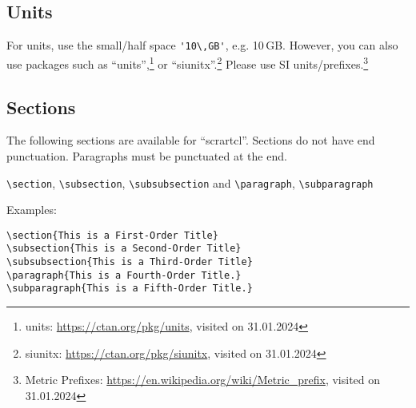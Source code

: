 \documentclass[
  paper       = a4,
  headheight  = 16pt,
  footheight  = 16pt,
  fontsize    = 10pt,
  twoside     = true,
  titlepage   = true,
]{scrartcl}
\begin{document}
\subsection{Units}

For units, use the small/half space \lstinline|'10\,GB'|, e.g. 10\,GB.
However, you can also use packages such as \enquote{units},\footnote{units: \url{https://ctan.org/pkg/units}, visited on 31.01.2024}
or \enquote{siunitx}.\footnote{siunitx: \url{https://ctan.org/pkg/siunitx}, visited on 31.01.2024}
Please use SI units/prefixes.\footnote{Metric Prefixes: \url{https://en.wikipedia.org/wiki/Metric_prefix}, visited on 31.01.2024}


\subsection{Sections}

The following sections are available for \enquote{scrartcl}.
Sections do not have end punctuation.
Paragraphs must be punctuated at the end.

\verb|\section|, \verb|\subsection|, \verb|\subsubsection| and \verb|\paragraph|, \verb|\subparagraph|

\noindent
Examples:
\begin{verbatim}
\section{This is a First-Order Title}
\subsection{This is a Second-Order Title}
\subsubsection{This is a Third-Order Title}
\paragraph{This is a Fourth-Order Title.}
\subparagraph{This is a Fifth-Order Title.}
\end{verbatim}
\end{document}
